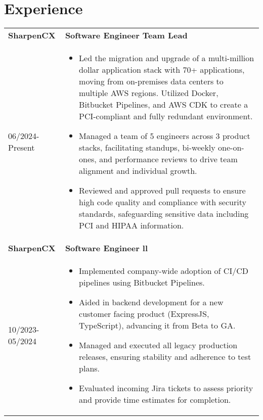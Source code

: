 \documentclass[a4paper,10pt]{article}
\begin{document}
\section*{\textcolor{blueishgray}{Experience}}
\begin{tabularx}{\linewidth}{l|>{\raggedright\arraybackslash}X}
  \textbf{\textcolor{blueishgray}{SharpenCX}} & \textbf{\textcolor{blueishgray}{Software Engineer Team Lead}} \\ {\small \textcolor{datecolor}{06/2024-Present}} & 
  \begin{itemize}[leftmargin=*]
    \item Led the migration and upgrade of a multi-million dollar application stack with 70+ applications, moving from on-premises data centers to multiple AWS regions. Utilized Docker, Bitbucket Pipelines, and AWS CDK to create a PCI-compliant and fully redundant environment.
    \item Managed a team of 5 engineers across 3 product stacks, facilitating standups, bi-weekly one-on-ones, and performance reviews to drive team alignment and individual growth.
    \item Reviewed and approved pull requests to ensure high code quality and compliance with security standards, safeguarding sensitive data including PCI and HIPAA information.
  \end{itemize} \\
  \textbf{\textcolor{blueishgray}{SharpenCX}} & \textbf{\textcolor{blueishgray}{Software Engineer ll}} \\ {\small \textcolor{datecolor}{10/2023-05/2024}} &
  \begin{itemize}[leftmargin=*]
    \item Implemented company-wide adoption of CI/CD pipelines using Bitbucket Pipelines. 
    \item Aided in backend development for a new customer facing product (ExpressJS, TypeScript), advancing it from Beta to GA.
    \item Managed and executed all legacy production releases, ensuring stability and adherence to test plans.
    \item Evaluated incoming Jira tickets to assess priority and provide time estimates for completion.
  \end{itemize} \\

\end{tabularx}
\end{document}
